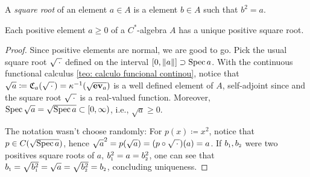 A \textit{square root} of an element $a\in A$ is a element $b\in A$ such that $b^2=a$.

\begin{teorema}
\label{teo: a raiz quadrada}
Each positive element $a\geqslant 0$ of a $C^*$-algebra $A$ has a unique positive square root.
\begin{proof}
Since positive elements are normal, we are good to go. Pick the usual square root $\sqrt{\operatorname{\,\cdot\,}}$ defined on the interval $[0, \|a\|] \supset \operatorname{Spec} a$. With the continuous functional calculus \ref{teo: calculo funcional continou}, notice that $\sqrt{a} \coloneqq \mathfrak C_a(\sqrt{\operatorname{\,\cdot\,}}) = {\kappa}^{-1}(\sqrt{\boldsymbol{\operatorname{ev}}_a})$ is a well defined element of $A$, self-adjoint since and the square root $\sqrt{\operatorname{\,\cdot\,}}$ is a real-valued function. Moreover, $\operatorname{Spec} \sqrt a = \sqrt{\operatorname{Spec} a} \subset [0,\infty)$, i.e., $\sqrt{a} \geq 0$. 

The notation wasn't choose randomly: For $p(x) \coloneqq x^2$, notice that $p \in C(\sqrt{\operatorname{Spec} a})$, hence $\sqrt{a}^2 = p(\sqrt{a}) = (p \circ \sqrt{\operatorname{\,\cdot\,}})(a) = a$. If $\sub b1, \sub b2$ were two positives square roots of $a$, $\sub b1^2 = a = \sub b2^2$, one can see that $\sub b1 = \sqrt{\sub b1^2} = \sqrt{a}  = \sqrt{\sub b2^2} = \sub b2$, concluding uniqueness.
\end{proof}
\end{teorema}



